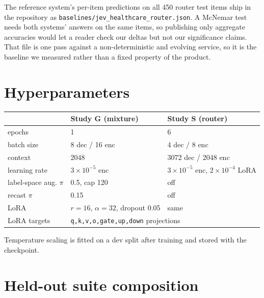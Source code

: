The reference system's per-item predictions on all 450 router test items
ship in the repository as
\texttt{baselines/jev\_healthcare\_router.json}. A McNemar test needs both
systems' answers on the same items, so publishing only aggregate
accuracies would let a reader check our deltas but not our significance
claims. That file is one pass against a non-deterministic and evolving
service, so it is the baseline we measured rather than a fixed property
of the product.

\section{Hyperparameters}
\label{app:hparams}

\begin{center}
\small
\begin{tabular}{lll}
\toprule
 & Study G (mixture) & Study S (router) \\
\midrule
epochs & 1 & 6 \\
batch size & 8 dec / 16 enc & 4 dec / 8 enc \\
context & 2048 & 3072 dec / 2048 enc \\
learning rate & $3\times10^{-5}$ enc & $3\times10^{-5}$ enc, $2\times10^{-4}$ LoRA \\
label-space aug. $\pi$ & 0.5, cap 120 & off \\
\noul{} recast $\pi$ & 0.15 & off \\
LoRA & $r{=}16$, $\alpha{=}32$, dropout 0.05 & same \\
LoRA targets & \multicolumn{2}{l}{\texttt{q,k,v,o,gate,up,down} projections} \\
\bottomrule
\end{tabular}
\end{center}

Temperature scaling is fitted on a dev split after training and stored
with the checkpoint.

\section{Held-out suite composition}
\label{app:suite}

